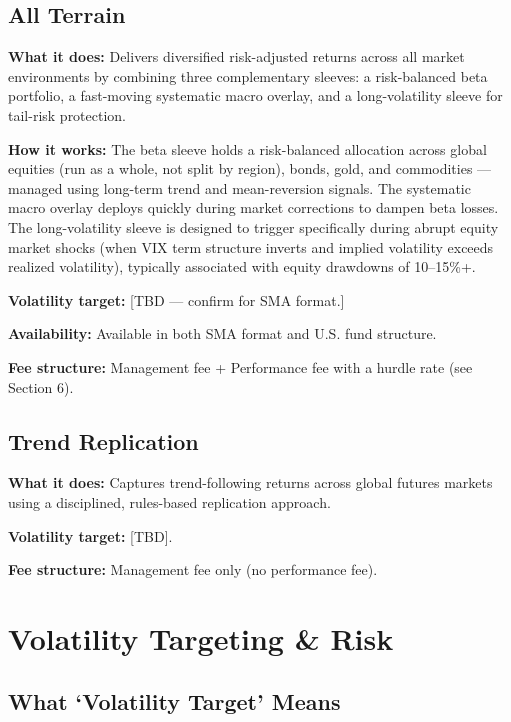 \documentclass{resolve-whitepaper}
\begin{document}
\subsection{All Terrain}\label{all-terrain}

\textbf{What it does:} Delivers diversified risk-adjusted returns across
all market environments by combining three complementary sleeves: a
risk-balanced beta portfolio, a fast-moving systematic macro overlay,
and a long-volatility sleeve for tail-risk protection.

\textbf{How it works:} The beta sleeve holds a risk-balanced allocation
across global equities (run as a whole, not split by region), bonds,
gold, and commodities --- managed using long-term trend and
mean-reversion signals. The systematic macro overlay deploys quickly
during market corrections to dampen beta losses. The long-volatility
sleeve is designed to trigger specifically during abrupt equity market
shocks (when VIX term structure inverts and implied volatility exceeds
realized volatility), typically associated with equity drawdowns of
10--15\%+.

\textbf{Volatility target:} {[}TBD --- confirm for SMA format.{]}

\textbf{Availability:} Available in both SMA format and U.S. fund
structure.

\textbf{Fee structure:} Management fee + Performance fee with a hurdle
rate (see Section 6).

\subsection{Trend Replication}\label{trend-replication}

\textbf{What it does:} Captures trend-following returns across global
futures markets using a disciplined, rules-based replication approach.

\textbf{Volatility target:} {[}TBD{]}.

\textbf{Fee structure:} Management fee only (no performance fee).

\sectionpagebreak

\section{Volatility Targeting \& Risk}\label{volatility-targeting-risk}

\subsection{What `Volatility Target'
Means}\label{what-volatility-target-means}
\end{document}
